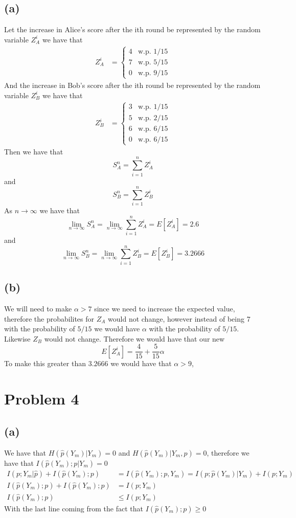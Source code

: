 \subsection*{(a)}
Let the increase in Alice's score after the ith round be 
represented by the random variable $Z_A^i$ we have that
\begin{align*}
    Z_A^i&=\begin{cases}
        4 & \text{w.p. } 1/15\\
        7 & \text{w.p. } 5/15\\
        0 & \text{w.p. } 9/15
    \end{cases}
\end{align*}
And the increase in Bob's score after the ith round be
represented by the random variable $Z_B^i$ we have that
\begin{align*}
    Z_B^i&=\begin{cases}
        3 & \text{w.p. } 1/15\\
        5 & \text{w.p. } 2/15\\
        6 & \text{w.p. } 6/15\\
        0 & \text{w.p. } 6/15
    \end{cases}
\end{align*}
Then we have that 
$$S_A^n=\sum_{i=1}^n Z_A^i$$
and
$$S_B^n=\sum_{i=1}^n Z_B^i$$
As $n\to\infty$ we have that
$$\lim_{n\to\infty}S_A^n=\lim_{n\to\infty}\sum_{i=1}^n Z_A^i=E[Z_A^i]=\boxed{2.6}$$
and
$$\lim_{n\to\infty}S_B^n=\lim_{n\to\infty}\sum_{i=1}^n Z_B^i=E[Z_B^i]=\boxed{3.2666}$$
\subsection*{(b)}
We will need to make $\alpha>7$ since we need to increase the expected value,
therefore the probabilites for $Z_A$ would not change, however instead 
of being 7 with the probability of $5/15$ we would have $\alpha$ with the
probability of $5/15$. Likewise $Z_B$ would not change. Therefore we would have that
our new 
$$E[Z_A^i]=\frac{4}{15}+\frac{5}{15}\alpha$$
To make this greater than $3.2666$ we would have that
$\boxed{\alpha>9}$, 
\section*{Problem 4}
\subsection*{(a)}
We have that $H(\hat{p}(Y_m)|Y_m)=0$ and $H(\hat{p}(Y_m)|Y_m,p)=0$, therefore
we have that $I(\hat{p}(Y_m);p|Y_m)=0$ 
\begin{align*}
    I(p;Y_m|\hat{p})+I(\hat{p}(Y_m);p)&=I(\hat{p}(Y_m);p,Y_m)
            =I(p;\hat{p}(Y_m)|Y_m)+I(p;Y_m)\\
            I(\hat{p}(Y_m);p)+I(\hat{p}(Y_m);p)&=I(p;Y_m)\\
            I(\hat{p}(Y_m);p)&\leq I(p;Y_m)
\end{align*}
With the last line coming from the fact that $I(\hat{p}(Y_m);p)\geq0$
